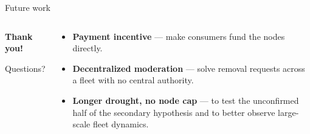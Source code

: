 {
\setlength{\splitpos}{0.55\paperwidth} %
\leftfooterwhitetrue
\begin{frame}{Future work}
  \begin{columns}[T]
    \begin{textcolumn}
      \color{white}
      {\Large\textbf{Thank you!}}

      \medskip
      {\large Questions?}
    \end{textcolumn}
    \begin{textcolumn}
      \small
      \begin{itemize}
        \item \textbf{Payment incentive} --- make consumers fund the nodes
          directly.
        \item \textbf{Decentralized moderation} --- solve removal requests
          across a fleet with no central authority.
        \item \textbf{Longer drought, no node cap} --- to test the unconfirmed half of the secondary hypothesis and to better observe large-scale fleet dynamics.
      \end{itemize}
    \end{textcolumn}
  \end{columns}
\end{frame}
}
\setlength{\splitpos}{0pt}\leftfooterwhitefalse %
